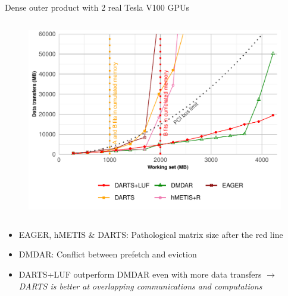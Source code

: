 \documentclass{libs/ufc_format}
\begin{document}
\begin{frame}{Dense outer product with 2 real Tesla V100 GPUs}
\begin{columns}{}
        \begin{column}{0.5\textwidth}
	\begin{figure}
		\includegraphics[scale = 0.3]{Images/DT_dynamic_data_aware_no_hfp_gemini-2-ipdps_2GPU.pdf}
	\end{figure}
		\end{column}
		\end{columns}
	\begin{itemize}
		\item EAGER, hMETIS \& DARTS: Pathological matrix size after the red line
		\item DMDAR: Conflict between prefetch and eviction
		 \item DARTS+LUF outperform DMDAR even with more data transfers $\rightarrow$ \emph{DARTS is better at 
		overlapping communications and computations}
	\end{itemize}
\end{frame}
\end{document}

